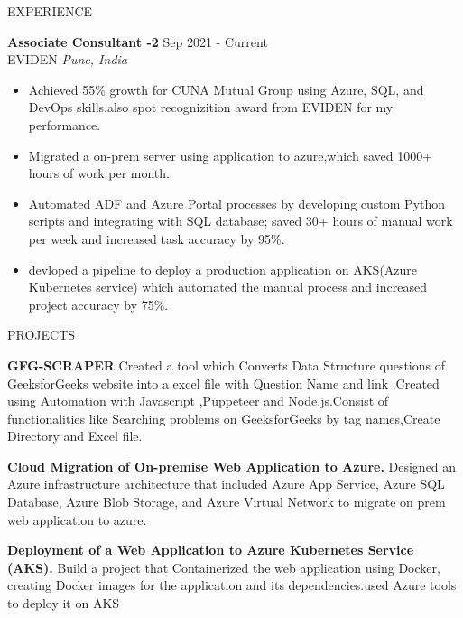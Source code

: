 \documentclass{resume} %
\begin{document}
\begin{rSection}{EXPERIENCE}

\textbf{Associate Consultant -2} \hfill Sep 2021 - Current\\
EVIDEN \hfill \textit{Pune, India}
 \begin{itemize}
    \itemsep -3pt {} 
     \item Achieved 55\% growth for CUNA Mutual Group using Azure, SQL, and DevOps skills.also spot recognizition award from EVIDEN for my performance. 
     \item Migrated a on-prem server using application to azure,which saved 1000+ hours of work per month.
     \item Automated ADF and Azure Portal processes by developing custom Python scripts and integrating with SQL database; saved 30+ hours of manual work per week and increased task accuracy by 95\%.
    \item devloped a pipeline to deploy a production application on AKS(Azure Kubernetes service) which automated the manual process and increased project accuracy by 75\%. 
 \end{itemize}
 

\end{rSection} 


\begin{rSection}{PROJECTS}
\vspace{-1.25em}
\item \textbf{GFG-SCRAPER} {Created a tool which Converts Data Structure questions of GeeksforGeeks
website into a excel file with Question Name and link .Created using Automation with Javascript ,Puppeteer and Node.js.Consist of functionalities like Searching problems on GeeksforGeeks by tag
names,Create Directory and Excel file.}
\item \textbf{Cloud Migration of On-premise Web Application to Azure.} {Designed an Azure infrastructure architecture that included Azure App Service, Azure SQL Database, Azure Blob Storage, and Azure Virtual Network to migrate on prem web application to azure.}
\item \textbf{Deployment of a Web Application to Azure Kubernetes Service (AKS).} {Build a project that Containerized the web application using Docker, creating Docker images for the application and its dependencies.used Azure tools to deploy it on AKS}
\end{rSection} 
\end{document}
